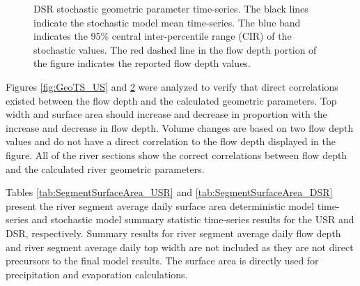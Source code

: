 \begin{linenumbers}
\begin{landscape}
\begin{figure}
\begin{subfigure}{0.7\textwidth}
			\label{sub:GeoTS_G}
		\end{subfigure}
		\caption[DSR stochastic geometric parameter time-series.]{DSR stochastic geometric parameter time-series. The black lines indicate the stochastic model mean time-series.  The blue band indicates the 95\% central inter-percentile range (CIR) of the stochastic values.  The red dashed line in the flow depth portion of the figure indicates the reported flow depth values.}
		\label{fig:GeoTS_DS}
	\end{figure}
\end{landscape}

Figures \ref{fig:GeoTS_US} and \ref{fig:GeoTS_DS} were analyzed to verify that direct correlations existed between the flow depth and the calculated geometric parameters.  Top width and surface area should increase and decrease in proportion with the increase and decrease in flow depth.  Volume changes are based on two flow depth values and do not have a direct correlation to the flow depth displayed in the figure.  All of the river sections show the correct correlations between flow depth and the calculated river geometric parameters.

Tables \ref{tab:SegmentSurfaceArea_USR} and \ref{tab:SegmentSurfaceArea_DSR} present the river segment average daily surface area deterministic model time-series and stochastic model summary statistic time-series results for the USR and DSR, respectively.  Summary results for river segment average daily flow depth and river segment average daily top width are not included as they are not direct precursors to the final model results.  The surface area is directly used for precipitation and evaporation calculations.

\subtabletop
\begin{table}[htbp]
	\centering
	\caption[USR river segment surface area deterministic and stochastic model numerical results.]{USR river segment surface area deterministic and stochastic model numerical results.  Values are in hectares (\si{\hectare}) with values in parentheses in acres (\si{\acre}).}
	\label{tab:SegmentSurfaceArea_USR}
	\begin{subtable}{\textwidth}
		\centering
		
	\end{subtable}\\
	\tablevspace
	\begin{subtable}{\textwidth}
		\centering
		
	\end{subtable}\\
\end{table}


\end{linenumbers}

